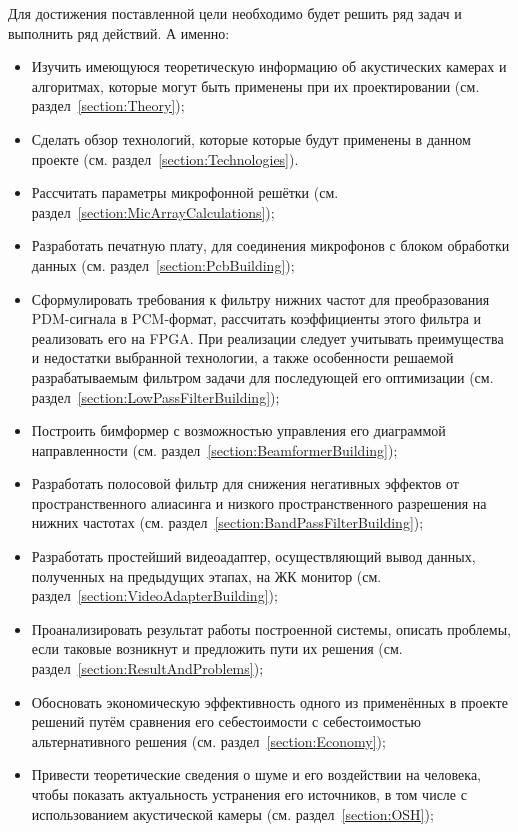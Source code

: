 Для достижения поставленной цели необходимо будет решить ряд задач и выполнить ряд действий. А именно:
\begin{itemize}
	\item Изучить имеющуюся теоретическую информацию об акустических камерах и алгоритмах, которые могут быть применены при их проектировании (см. раздел~\ref{section:Theory});
	\item Сделать обзор технологий, которые которые будут применены в данном проекте (см. раздел~\ref{section:Technologies}).
	\item Рассчитать параметры микрофонной решётки (см. раздел~\ref{section:MicArrayCalculations});
	\item Разработать печатную плату, для соединения микрофонов с блоком обработки данных (см. раздел~\ref{section:PcbBuilding});
	\item Сформулировать требования к фильтру нижних частот для преобразования PDM-сигнала в PCM-формат, рассчитать коэффициенты этого фильтра и реализовать его на FPGA. При реализации следует учитывать преимущества и недостатки выбранной технологии, а также особенности решаемой разрабатываемым фильтром задачи для последующей его оптимизации (см. раздел~\ref{section:LowPassFilterBuilding});
	\item Построить бимформер с возможностью управления его диаграммой направленности (см. раздел~\ref{section:BeamformerBuilding});
	\item Разработать полосовой фильтр для снижения негативных эффектов от пространственного алиасинга и низкого пространственного разрешения на нижних частотах (см. раздел~\ref{section:BandPassFilterBuilding});  
	\item Разработать простейший видеоадаптер, осуществляющий вывод данных, полученных на предыдущих этапах, на ЖК монитор (см. раздел~\ref{section:VideoAdapterBuilding});
	\item Проанализировать результат работы построенной системы, описать проблемы, если таковые возникнут и предложить пути их решения (см. раздел~\ref{section:ResultAndProblems});
	\item Обосновать экономическую эффективность одного из применённых в проекте решений путём сравнения его себестоимости с себестоимостью альтернативного решения (см. раздел~\ref{section:Economy});
	\item Привести теоретические сведения о шуме и его воздействии на человека, чтобы показать актуальность устранения его источников, в том числе с использованием акустической камеры (см. раздел~\ref{section:OSH});
\end{itemize}